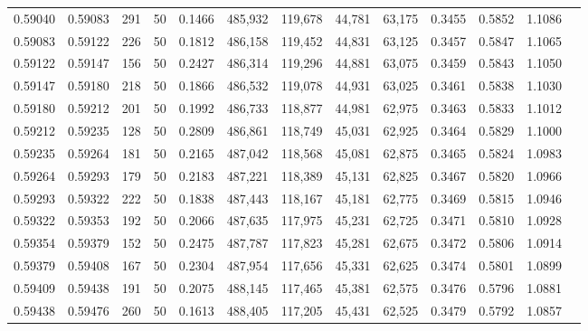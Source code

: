 \begin{tabular}{rrrrrrrrrrrrr}
0.59040 & 0.59083 &   291 &  50 &                                     0.1466 & 485,932 & 119,678 &  44,781 &  63,175 & 0.3455 & 0.5852 & 1.1086 \\
0.59083 & 0.59122 &   226 &  50 &                                     0.1812 & 486,158 & 119,452 &  44,831 &  63,125 & 0.3457 & 0.5847 & 1.1065 \\
0.59122 & 0.59147 &   156 &  50 &                                     0.2427 & 486,314 & 119,296 &  44,881 &  63,075 & 0.3459 & 0.5843 & 1.1050 \\
0.59147 & 0.59180 &   218 &  50 &                                     0.1866 & 486,532 & 119,078 &  44,931 &  63,025 & 0.3461 & 0.5838 & 1.1030 \\
0.59180 & 0.59212 &   201 &  50 &                                     0.1992 & 486,733 & 118,877 &  44,981 &  62,975 & 0.3463 & 0.5833 & 1.1012 \\
0.59212 & 0.59235 &   128 &  50 &                                     0.2809 & 486,861 & 118,749 &  45,031 &  62,925 & 0.3464 & 0.5829 & 1.1000 \\
0.59235 & 0.59264 &   181 &  50 &                                     0.2165 & 487,042 & 118,568 &  45,081 &  62,875 & 0.3465 & 0.5824 & 1.0983 \\
0.59264 & 0.59293 &   179 &  50 &                                     0.2183 & 487,221 & 118,389 &  45,131 &  62,825 & 0.3467 & 0.5820 & 1.0966 \\
0.59293 & 0.59322 &   222 &  50 &                                     0.1838 & 487,443 & 118,167 &  45,181 &  62,775 & 0.3469 & 0.5815 & 1.0946 \\
0.59322 & 0.59353 &   192 &  50 &                                     0.2066 & 487,635 & 117,975 &  45,231 &  62,725 & 0.3471 & 0.5810 & 1.0928 \\
0.59354 & 0.59379 &   152 &  50 &                                     0.2475 & 487,787 & 117,823 &  45,281 &  62,675 & 0.3472 & 0.5806 & 1.0914 \\
0.59379 & 0.59408 &   167 &  50 &                                     0.2304 & 487,954 & 117,656 &  45,331 &  62,625 & 0.3474 & 0.5801 & 1.0899 \\
0.59409 & 0.59438 &   191 &  50 &                                     0.2075 & 488,145 & 117,465 &  45,381 &  62,575 & 0.3476 & 0.5796 & 1.0881 \\
0.59438 & 0.59476 &   260 &  50 &                                     0.1613 & 488,405 & 117,205 &  45,431 &  62,525 & 0.3479 & 0.5792 & 1.0857 \\

\end{tabular}
